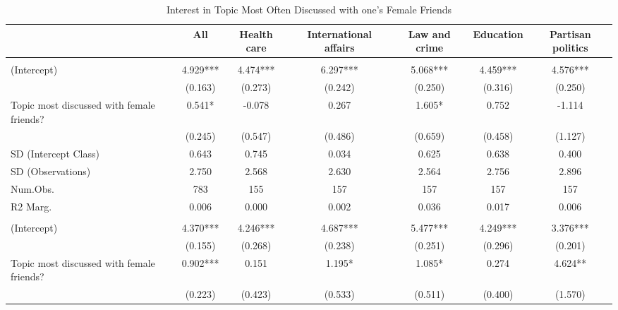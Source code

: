 \documentclass[
  letterpaper,
  DIV=11,
  numbers=noendperiod]{scrreprt}
\begin{document}
\begin{table}
\centering\centering
\caption{Interest in Topic Most Often Discussed with one's Female Friends \label{tab:lmeFemaleFriends}}
\centering
\fontsize{6}{8}\selectfont
\begin{tabular}[t]{lcccccc}
\toprule
  & All & Health care & International affairs & Law and crime & Education & Partisan politics\\
\midrule
\addlinespace[0.5em]
\multicolumn{7}{l}{\textit{Boys}}\\
\midrule \hspace{1em}(Intercept) & 4.929*** & 4.474*** & 6.297*** & 5.068*** & 4.459*** & 4.576***\\
\hspace{1em} & (0.163) & (0.273) & (0.242) & (0.250) & (0.316) & (0.250)\\
\hspace{1em}Topic most discussed with female friends? & 0.541* & -0.078 & 0.267 & 1.605* & 0.752 & -1.114\\
\hspace{1em} & (0.245) & (0.547) & (0.486) & (0.659) & (0.458) & (1.127)\\
\hspace{1em}SD (Intercept Class) & 0.643 & 0.745 & 0.034 & 0.625 & 0.638 & 0.400\\
\hspace{1em}SD (Observations) & 2.750 & 2.568 & 2.630 & 2.564 & 2.756 & 2.896\\
\hspace{1em}Num.Obs. & 783 & 155 & 157 & 157 & 157 & 157\\
\hspace{1em}R2 Marg. & 0.006 & 0.000 & 0.002 & 0.036 & 0.017 & 0.006\\
\addlinespace[0.5em]
\multicolumn{7}{l}{\textit{Girls}}\\
\midrule \hspace{1em}(Intercept) & 4.370*** & 4.246*** & 4.687*** & 5.477*** & 4.249*** & 3.376***\\
\hspace{1em} & (0.155) & (0.268) & (0.238) & (0.251) & (0.296) & (0.201)\\
\hspace{1em}Topic most discussed with female friends? & 0.902*** & 0.151 & 1.195* & 1.085* & 0.274 & 4.624**\\
\hspace{1em} & (0.223) & (0.423) & (0.533) & (0.511) & (0.400) & (1.570)\\

\end{tabular}
\end{table}
\end{document}
